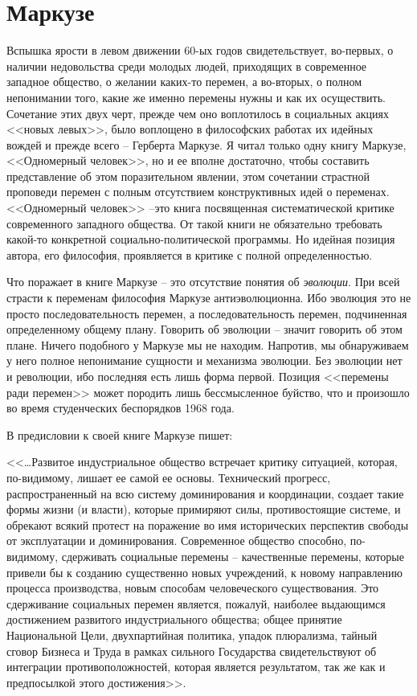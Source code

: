 \documentclass{book}
\begin{document}
\section{Маркузе}

Вспышка ярости в левом движении 60-ых годов свидетель­ствует, во-первых, о наличии 
недовольства среди молодых лю­дей, приходящих в современное западное общество, о 
желании каких-то перемен, а во-вторых, о полном непонимании то­го, какие же именно 
перемены нужны и как их осуществить. Сочетание этих двух черт, прежде чем оно 
воплотилось в социальных акциях <<новых левых>>, было воплощено в философских работах 
их идейных вождей и прежде всего -- Герберта Маркузе. Я читал только одну книгу 
Маркузе, <<Одномерный человек>>, но и ее вполне достаточно, чтобы составить 
представление об этом поразительном явлении, этом сочетании страстной проповеди 
перемен с полным отсутствием конструктивных идей о переменах. <<Одномерный человек>> 
--это книга посвященная систематической критике современного западного общества. От 
такой книги не обязательно требовать какой-то конкретной социально-политической 
программы. Но идейная позиция автора, его философия, проявляется в критике с полной 
определенностью.

Что поражает в книге Маркузе -- это отсутствие понятия об \textit{эволюции}.  При 
всей страсти к переменам философия Маркузе антиэволюционна. Ибо эволюция это не 
просто последовательность перемен, а последовательность перемен, подчиненная 
определенному общему плану. Говорить об эволюции -- значит говорить об этом плане. 
Ничего подобного у Маркузе мы не находим. Напротив, мы обнаруживаем у него полное 
непонимание сущности и механизма эволюции. Без эволюции нет и революции, ибо 
последняя есть лишь форма первой. Позиция <<перемены ради перемен>> может породить 
лишь бессмысленное буйство, что и произошло во время студенческих беспо­рядков 1968 
года.

В предисловии к своей книге Маркузе пишет:

<<\ldots Развитое индустриальное общество встречает критику ситуацией, которая, по-ви\-ди\-мо\-му, лишает ее самой ее основы. Технический прогресс, распространенный на всю систему доминирования и координации, создает такие формы жизни (и власти), которые примиряют силы, противостоящие системе, и обрекают всякий протест на поражение во имя исторических перспектив свободы от эксплуатации и доминирования. Современное общество способно, по-видимому, сдерживать социальные перемены -- качественные перемены, которые привели бы к созданию существенно новых учреждений, к новому направлению процесса производства, новым способам человеческого существования. Это сдерживание социальных перемен являет­ся, пожалуй, наиболее выдающимся достижением развитого индустриального общества; общее принятие Национальной Цели, двухпартийная политика, упадок плюрализма, тайный сговор Бизнеса и Труда в рамках сильного Государства сви­детельствуют об интеграции противоположностей, которая яв­ляется результатом, так же как и предпосылкой 
этого 
дости­жения>>.%
\end{document}
